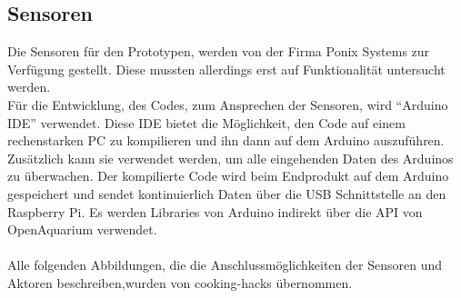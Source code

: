 \subsection{Sensoren}
Die Sensoren f\"ur den Prototypen, werden von der Firma Ponix Systems zur Verf\"ugung gestellt. Diese mussten allerdings erst auf Funktionalit\"at untersucht werden. \\
F\"ur die Entwicklung, des Codes, zum Ansprechen der Sensoren, wird "`Arduino \gls{IDE}"' verwendet. Diese \gls{IDE} bietet die M\"oglichkeit, den Code auf einem rechenstarken PC zu kompilieren und ihn dann auf dem Arduino auszuf\"uhren. Zus\"atzlich kann sie verwendet werden, um alle eingehenden Daten des Arduinos zu \"uberwachen.
Der kompilierte Code wird beim Endprodukt auf dem Arduino gespeichert und sendet kontinuierlich Daten \"uber die \gls{USB} Schnittstelle an den Raspberry Pi. Es werden Libraries von Arduino indirekt \"uber die \gls{API} von OpenAquarium verwendet. \\ \mbox{} \\
Alle folgenden Abbildungen, die die Anschlussmöglichkeiten der Sensoren und Aktoren beschreiben,wurden von cooking-hacks übernommen. \cite{OpenAquarium}

\newpage
